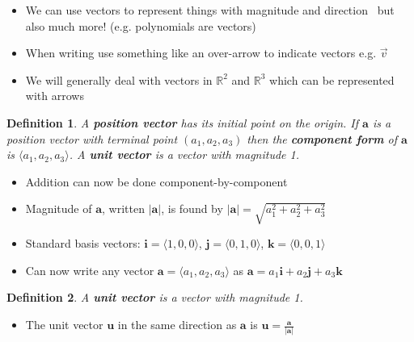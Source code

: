 \documentclass[letterpaper, 11pt, openany]{book}
\theoremstyle{mytheoremstyle}
\newtheorem{definition}{Definition}[section]
\theoremstyle{myexamplestyle}
\begin{document}
\begin{itemize}
    \item We can use vectors to represent things with magnitude and direction \faMeh \ but also much more! (e.g. polynomials are vectors)
    \item[{\faExclamationTriangle[solid]}] When writing use something like an over-arrow to indicate vectors e.g. $\vec{v}$
    \item We will generally deal with vectors in $\mathbb{R}^{2}$ and $\mathbb{R}^{3}$ which can be represented with arrows 
\end{itemize}


\begin{definition}\label{d:position-vector}
    A \textbf{position vector} has its initial point on the origin. If $\mathbf{a}$ is a position vector with terminal point $(a_{1}, a_{2}, a_{3})$ then the \textbf{component form} of $\mathbf{a}$ is $\langle a_{1}, a_{2}, a_{3} \rangle$. A \textbf{unit vector} is a vector with magnitude 1.
\end{definition}

\begin{itemize}
    \item Addition can now be done component-by-component
    \item Magnitude of $\mathbf{a}$, written $|\mathbf{a}|$, is found by $|\mathbf{a}| = \sqrt{a_{1}^{2} + a_{2}^{2} + a_{3}^{2}}$
    \item Standard basis vectors: $\mathbf{i} = \langle 1, 0, 0 \rangle$, $\mathbf{j} = \langle 0, 1, 0 \rangle$, $\mathbf{k} = \langle 0, 0, 1 \rangle$
    \item Can now write any vector $\mathbf{a} = \langle a_{1}, a_{2}, a_{3} \rangle$ as $\mathbf{a} = a_{1}\mathbf{i} + a_{2}\mathbf{j} + a_{3}\mathbf{k}$
\end{itemize}

\begin{definition}\label{d:unit-vector}
    A \textbf{unit vector} is a vector with magnitude 1.
\end{definition}

\begin{itemize}
    \item The unit vector $\mathbf{u}$ in the same direction as $\mathbf{a}$ is $\displaystyle \mathbf{u} = \frac{\mathbf{a}}{|\mathbf{a}|}$
\end{itemize}
\end{document}
